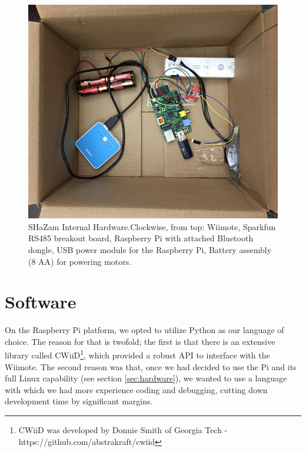 \documentclass[conference, twocolumn]{IEEEtran}
\begin{document}
\begin{figure}[!t]
\begin{center}
\includegraphics[width=0.8\linewidth]{../images/shazam_inner}
\end{center}

\caption{SHaZam Internal Hardware.Clockwise, from top: Wiimote, Sparkfun RS485 breakout board, Raspberry Pi with attached Bluetooth dongle, USB power module for the Raspberry Pi, Battery assembly (8 AA) for powering motors.}
\label{fig:hw_inner}
\end{figure}

\section{Software}
On the Raspberry Pi platform, we opted to utilize Python as our language of choice. The reason for that is twofold; the first is that there is an extensive library called CWiiD\footnote{CWiiD was developed by Donnie Smith of Georgia Tech - https://github.com/abstrakraft/cwiid}, which provided a robust API to interface with the Wiimote. The second reason was that, once we had decided to use the Pi and its full Linux capability (see section \ref{sec:hardware}), we wanted to use a language with which we had more experience coding and debugging, cutting down development time by significant margins. 
\end{document}
